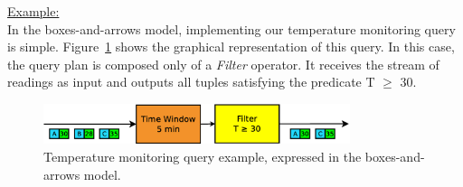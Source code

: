 
\underline{Example:}\\
In the boxes-and-arrows model, implementing our temperature monitoring query is simple. 
Figure~\ref{fig:baa-example} shows the graphical representation of this query.
In this case, the query plan is composed only of a \emph{Filter} operator. It receives the stream of 
readings as input and outputs all tuples satisfying the predicate T $\geq$ 30. 

\begin{figure}[t]
    \centering
    \includegraphics[width=0.8\textwidth]{img/tesi/baa-example}
    \caption{Temperature monitoring query example, expressed in the boxes-and-arrows model.}
    \label{fig:baa-example}
\end{figure}
